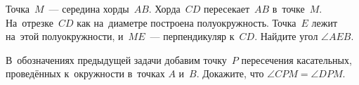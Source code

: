 \begin{problems}
\item
Точка~$M$~--- середина хорды~$AB$.
Хорда~$CD$ пересекает~$AB$ в~точке~$M$.
На~отрезке~$CD$ как на~диаметре построена полуокружность.
Точка~$E$ лежит на~этой полуокружности, и~$ME$~--- перпендикуляр к~$CD$.
Найдите угол $\angle AEB$.

\item
В~обозначениях предыдущей задачи добавим точку~$P$ пересечения касательных,
проведённых к~окружности в~точках $A$ и~$B$.
Докажите, что $\angle CPM = \angle DPM$.


\end{problems}

